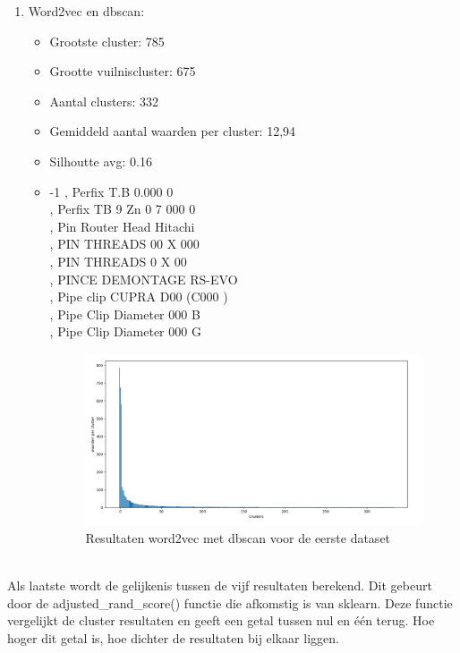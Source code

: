 \begin{enumerate}
\item Word2vec en dbscan:
\begin{itemize}
    \item Grootste cluster: 785
    \item Grootte vuilniscluster: 675
    \item Aantal clusters: 332
    \item Gemiddeld aantal waarden per cluster: 12,94
    \item Silhoutte avg:  0.16
    \item
    -1 , Perfix T.B 0.000 0
    \\ , Perfix TB 9 Zn 0 7 000 0
    \\ , Pin Router Head Hitachi
    \\ , PIN THREADS 00 X 000
    \\ , PIN THREADS 0 X 00
    \\ , PINCE DEMONTAGE RS-EVO
    \\ , Pipe clip CUPRA D00 (C000 )
    \\ , Pipe Clip Diameter 000  B
    \\ , Pipe Clip Diameter 000  G
    \begin{figure}[h]
        \centering
        \includegraphics[width=0.7\linewidth]{../foto's/datadbscanword2vec}
        \caption{Resultaten word2vec met dbscan voor de eerste dataset}
        \label{fig:dataset1_word2vec_dbscan}
    \end{figure}
\end{itemize}
\end{enumerate}
\\\indent
Als laatste wordt de gelijkenis tussen de vijf resultaten berekend. Dit gebeurt door de adjusted\_rand\_score() functie die afkomstig is van sklearn. Deze functie vergelijkt de cluster resultaten en geeft een getal tussen nul en één terug. Hoe hoger dit getal is, hoe dichter de resultaten bij elkaar liggen.
\\\indent

